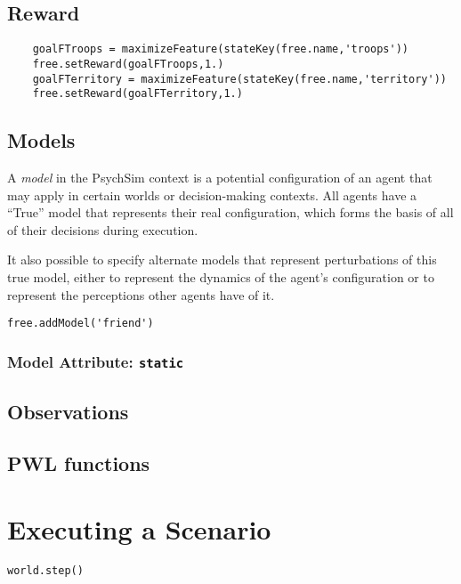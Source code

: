 \documentclass{book}
\begin{document}
\section{Reward}

\begin{verbatim}
    goalFTroops = maximizeFeature(stateKey(free.name,'troops'))
    free.setReward(goalFTroops,1.)
    goalFTerritory = maximizeFeature(stateKey(free.name,'territory'))
    free.setReward(goalFTerritory,1.)
\end{verbatim}

\section{Models}

A {\em model} in the PsychSim context is a potential configuration of an agent that may apply in certain worlds or decision-making contexts. All agents have a ``True'' model that represents their real configuration, which forms the basis of all of their decisions during execution. 


It also possible to specify alternate models that represent perturbations of this true model, either to represent the dynamics of the agent's configuration or to represent the perceptions other agents have of it.

\begin{verbatim}
free.addModel('friend')
\end{verbatim}

\subsection{Model Attribute: {\tt static}}

\section{Observations}

\section{PWL functions}\label{sec:pwl}

\chapter{Executing a Scenario}

\begin{verbatim}
world.step()
\end{verbatim}
\end{document}
